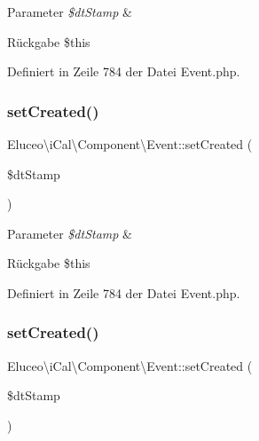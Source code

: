 \begin{DoxyParams}{Parameter}
{\em \$dt\+Stamp} & \\
\hline
\end{DoxyParams}
\begin{DoxyReturn}{Rückgabe}
\$this 
\end{DoxyReturn}


Definiert in Zeile 784 der Datei Event.\+php.

\mbox{\label{class_eluceo_1_1i_cal_1_1_component_1_1_event_a8a9ac44bf639ae275bebae3ad22eb238}} 
\subsubsection{\texorpdfstring{set\+Created()}{setCreated()}\hspace{0.1cm}{\footnotesize\ttfamily [2/3]}}
{\footnotesize\ttfamily Eluceo\textbackslash{}i\+Cal\textbackslash{}\+Component\textbackslash{}\+Event\+::set\+Created (\begin{DoxyParamCaption}\item[{}]{\$dt\+Stamp }\end{DoxyParamCaption})}


\begin{DoxyParams}{Parameter}
{\em \$dt\+Stamp} & \\
\hline
\end{DoxyParams}
\begin{DoxyReturn}{Rückgabe}
\$this 
\end{DoxyReturn}


Definiert in Zeile 784 der Datei Event.\+php.

\mbox{\label{class_eluceo_1_1i_cal_1_1_component_1_1_event_a8a9ac44bf639ae275bebae3ad22eb238}} 
\subsubsection{\texorpdfstring{set\+Created()}{setCreated()}\hspace{0.1cm}{\footnotesize\ttfamily [3/3]}}
{\footnotesize\ttfamily Eluceo\textbackslash{}i\+Cal\textbackslash{}\+Component\textbackslash{}\+Event\+::set\+Created (\begin{DoxyParamCaption}\item[{}]{\$dt\+Stamp }\end{DoxyParamCaption})}


